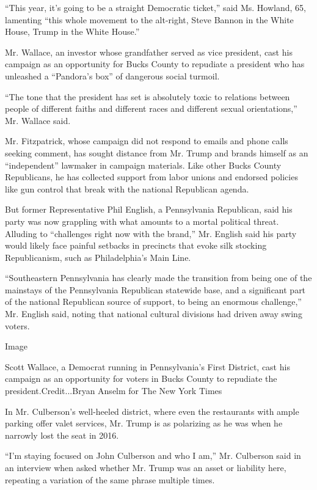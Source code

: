 ``This year, it's going to be a straight Democratic ticket,'' said Ms.
Howland, 65, lamenting ``this whole movement to the alt-right, Steve
Bannon in the White House, Trump in the White House.''

Mr. Wallace, an investor whose grandfather served as vice president,
cast his campaign as an opportunity for Bucks County to repudiate a
president who has unleashed a ``Pandora's box'' of dangerous social
turmoil.

``The tone that the president has set is absolutely toxic to relations
between people of different faiths and different races and different
sexual orientations,'' Mr. Wallace said.

Mr. Fitzpatrick, whose campaign did not respond to emails and phone
calls seeking comment, has sought distance from Mr. Trump and brands
himself as an ``independent'' lawmaker in campaign materials. Like other
Bucks County Republicans, he has collected support from labor unions and
endorsed policies like gun control that break with the national
Republican agenda.

But former Representative Phil English, a Pennsylvania Republican, said
his party was now grappling with what amounts to a mortal political
threat. Alluding to ``challenges right now with the brand,'' Mr. English
said his party would likely face painful setbacks in precincts that
evoke silk stocking Republicanism, such as Philadelphia's Main Line.

``Southeastern Pennsylvania has clearly made the transition from being
one of the mainstays of the Pennsylvania Republican statewide base, and
a significant part of the national Republican source of support, to
being an enormous challenge,'' Mr. English said, noting that national
cultural divisions had driven away swing voters.

Image

Scott Wallace, a Democrat running in Pennsylvania's First District, cast
his campaign as an opportunity for voters in Bucks County to repudiate
the president.Credit...Bryan Anselm for The New York Times

In Mr. Culberson's well-heeled district, where even the restaurants with
ample parking offer valet services, Mr. Trump is as polarizing as he was
when he narrowly lost the seat in 2016.

``I'm staying focused on John Culberson and who I am,'' Mr. Culberson
said in an interview when asked whether Mr. Trump was an asset or
liability here, repeating a variation of the same phrase multiple times.

